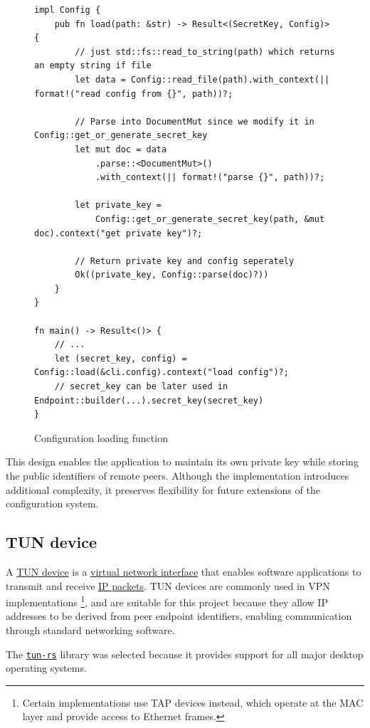 \documentclass[a4paper, 10pt]{article}
\begin{document}
\begin{figure}[H]
  \begin{verbatim}
impl Config {
    pub fn load(path: &str) -> Result<(SecretKey, Config)> {
        // just std::fs::read_to_string(path) which returns an empty string if file
        let data = Config::read_file(path).with_context(|| format!("read config from {}", path))?;

        // Parse into DocumentMut since we modify it in Config::get_or_generate_secret_key
        let mut doc = data
            .parse::<DocumentMut>()
            .with_context(|| format!("parse {}", path))?;

        let private_key =
            Config::get_or_generate_secret_key(path, &mut doc).context("get private key")?;

        // Return private key and config seperately
        Ok((private_key, Config::parse(doc)?))
    }
}

fn main() -> Result<()> {
    // ...
    let (secret_key, config) = Config::load(&cli.config).context("load config")?;
    // secret_key can be later used in Endpoint::builder(...).secret_key(secret_key)
}
  \end{verbatim}
  \caption{Configuration loading function}
\end{figure}

This design enables the application to maintain its own private key while storing the public identifiers of remote peers.
Although the implementation introduces additional complexity, it preserves flexibility for future extensions of the configuration system.

\subsection{TUN device} \label{sec:apptun}
A \href{https://en.wikipedia.org/wiki/TUN/TAP}{TUN device} is a \href{https://en.wikipedia.org/wiki/Network_virtualization}{virtual network interface}
that enables software applications to transmit and receive \href{https://en.wikipedia.org/wiki/Internet_Protocol}{IP packets}. TUN devices are commonly used in VPN implementations
\footnote{Certain implementations use TAP devices instead, which operate at the MAC layer and provide access to Ethernet frames.},
and are suitable for this project because they allow IP addresses to be derived from peer endpoint identifiers, enabling communication through standard networking software.

The \href{https://crates.io/crates/tun-rs/}{\texttt{tun-rs}} library was selected because it provides support for all major desktop operating systems.
\end{document}
